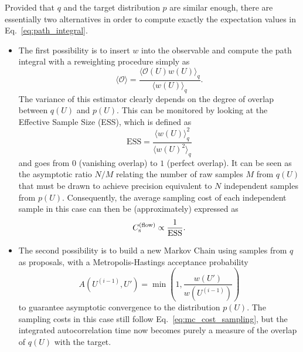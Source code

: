 \documentclass[12pt]{article}
\begin{document}
Provided that $q$ and the target distribution $p$ are similar enough, there are essentially two alternatives in order to compute exactly the expectation values in Eq.~\eqref{eq:path_integral}.
\begin{itemize}
    \item The first possibility is to insert $w$ into the observable and compute the path integral with a reweighting procedure simply as
    \begin{equation}
    \label{eq:reweighting}
        \langle \mathcal{O} \rangle = \frac{\langle \mathcal{O}(U)  w(U) \rangle_{q}}{\langle w(U) \rangle_{q}}.
    \end{equation}
    The variance of this estimator clearly depends on the degree of overlap between $q(U)$ and $p(U)$. This can be monitored by looking at the Effective Sample Size (ESS), which is defined as
    \begin{equation}
        \text{ESS} = \frac{\langle w(U) \rangle_{q}^2}{\langle w(U)^2 \rangle_{q}}
    \end{equation}
    and goes from $0$ (vanishing overlap) to $1$ (perfect overlap).
    It can be seen as the asymptotic ratio $N / M$ relating the number of raw samples $M$ from $q(U)$ that must be drawn to achieve precision equivalent to $N$ independent samples from $p(U)$. Consequently, the average sampling cost of each independent  sample in this case can then be (approximately) expressed as
    \begin{equation}
    \label{eq:is_cost_sampling}
        C_{\rm s}^{(\rm flow)} \propto \frac{1}{\text{ESS}}.
    \end{equation}
    \item The second possibility is to build a new Markov Chain using samples from $q$ as proposals, 
    with a Metropolis-Hastings acceptance probability
    \begin{equation} \label{eq:flow-mcmc}
        A(U^{(i-1)}, U') = \min \left( 1 , \frac{w(U')}{w(U^{(i-1)})} \right) %
    \end{equation}
    to guarantee asymptotic convergence to the distribution $p(U)$.
    The sampling costs in this case still follow Eq.~\eqref{eq:mc_cost_sampling}, but the integrated autocorrelation time now becomes purely a measure of the overlap of $q(U)$ with the target. %
\end{itemize}
\end{document}
